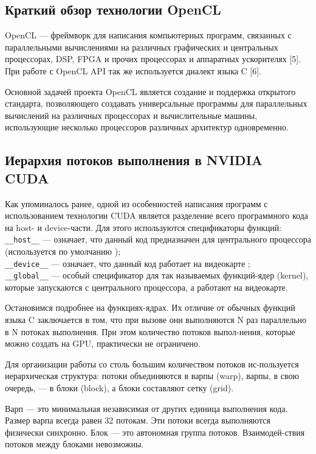 \subsection{Краткий обзор технологии OpenCL}

OpenCL --- фреймворк для написания компьютерных программ, связанных с параллельными вычислениями на различных графических и центральных процессорах, DSP, FPGA и прочих процессорах и аппаратных ускорителях [5]. При работе с OpenCL API так же используется диалект языка C [6].

Основной задачей проекта OpenCL является создание и поддержка открытого стандарта, позволяющего создавать универсальные программы для параллельных вычислений на различных процессорах и вычислительные машины, использующие несколько процессоров различных архитектур одновременно.

\subsection{Иерархия потоков выполнения в NVIDIA CUDA}

Как упоминалось ранее, одной из особенностей написания программ с использованием технологии CUDA является разделение всего программного кода на host- и device-части. Для этого используются спецификаторы функций:
\texttt{\_\_host\_\_} --- означает, что данный код предназначен для центрального процессора (используется по умолчанию ); \\
\texttt{\_\_device\_\_} --- означает, что данный код работает на видеокарте ; \\
\texttt{\_\_global\_\_} --- особый спецификатор для так называемых функций-ядер (kernel), которые запускаются с центрального процессора, а работают на видеокарте.

Остановимся подробнее на функциях-ядрах. Их отличие от обычных функций языка C заключается в том, что при вызове они выполняются N раз параллельно в N потоках выполнения. При этом количество потоков выпол-нения, которые можно создать на GPU, практически не ограничено.

Для организации работы со столь большим количеством потоков ис-пользуется иерархическая структура: потоки объединяются в варпы (warp), варпы, в свою очередь, — в блоки (block), а блоки составляют сетку (grid).

Варп — это минимальная независимая от других единица выполнения кода. Размер варпа всегда равен 32 потокам. Эти потоки всегда выполняются физически синхронно. Блок — это автономная группа потоков. Взаимодей-ствия потоков между блоками невозможны.

